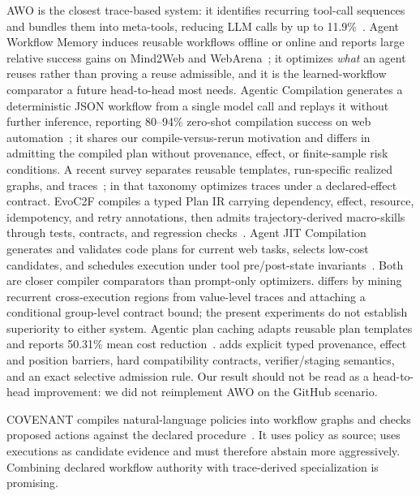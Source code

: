 AWO is the closest trace-based system: it identifies recurring tool-call sequences and
bundles them into meta-tools, reducing LLM calls by up to 11.9\%~\cite{abuzakuk2026awo}.
Agent Workflow Memory induces reusable workflows offline or online and reports large
relative success gains on Mind2Web and WebArena~\cite{wang2025awm}; it optimizes \emph{what}
an agent reuses rather than proving a reuse admissible, and it is the learned-workflow
comparator a future head-to-head most needs.  Agentic Compilation generates a deterministic
JSON workflow from a single model call and replays it without further inference, reporting
80--94\% zero-shot compilation success on web
automation~\cite{chundru2026agenticcompilation}; it shares our compile-versus-rerun
motivation and differs in admitting the compiled plan without provenance, effect, or
finite-sample risk conditions.  A recent survey separates reusable templates, run-specific
realized graphs, and traces~\cite{yue2026workflowsurvey}; in that taxonomy \method optimizes
traces under a declared-effect contract.
EvoC2F compiles a typed Plan IR carrying dependency, effect, resource, idempotency, and
retry annotations, then admits trajectory-derived macro-skills through tests, contracts,
and regression checks~\cite{wei2026evoc2f}.  Agent JIT Compilation generates and validates
code plans for current web tasks, selects low-cost candidates, and schedules execution under
tool pre/post-state invariants~\cite{winston2026agentjit}.  Both are closer compiler
comparators than prompt-only optimizers.  \method differs by mining recurrent
cross-execution regions from value-level traces and attaching a conditional group-level
contract bound; the present experiments do not establish superiority to either system.
Agentic plan caching adapts reusable plan templates and reports 50.31\% mean cost
reduction~\cite{zhang2025plancache}.  \method adds explicit typed provenance, effect and
position barriers, hard compatibility contracts, verifier/staging semantics, and an exact
selective admission rule.  Our result should not be read as a head-to-head improvement:
we did not reimplement AWO on the GitHub scenario.

COVENANT compiles natural-language policies into workflow graphs and checks proposed
actions against the declared procedure~\cite{wang2026covenant}.  It
uses policy as source; \method uses executions as candidate evidence and must therefore
abstain more aggressively.  Combining declared workflow authority with trace-derived
specialization is promising.

